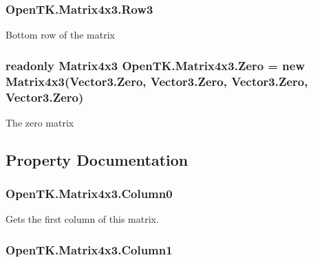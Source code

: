 \hypertarget{struct_open_t_k_1_1_matrix4x3_a8650610271ac5bd0afee0b96d1ffe5b9}{
\subsubsection[{Row3}]{ Open\-T\-K.\-Matrix4x3.\-Row3}}\label{struct_open_t_k_1_1_matrix4x3_a8650610271ac5bd0afee0b96d1ffe5b9}


Bottom row of the matrix 

\hypertarget{struct_open_t_k_1_1_matrix4x3_aafb18f8d0a699fc8d0b85a18f415b8ef}{
\subsubsection[{Zero}]{\setlength{\rightskip}{0pt plus 5cm}readonly {\bf Matrix4x3} Open\-T\-K.\-Matrix4x3.\-Zero = new {\bf Matrix4x3}(Vector3.\-Zero, Vector3.\-Zero, Vector3.\-Zero, Vector3.\-Zero)\hspace{0.3cm}{\ttfamily [static]}}}\label{struct_open_t_k_1_1_matrix4x3_aafb18f8d0a699fc8d0b85a18f415b8ef}


The zero matrix 



\subsection{Property Documentation}
\hypertarget{struct_open_t_k_1_1_matrix4x3_a386da1026761e5cc8faa795cb10867a5}{
\subsubsection[{Column0}]{ Open\-T\-K.\-Matrix4x3.\-Column0\hspace{0.3cm}{\ttfamily [get]}}}\label{struct_open_t_k_1_1_matrix4x3_a386da1026761e5cc8faa795cb10867a5}


Gets the first column of this matrix. 

\hypertarget{struct_open_t_k_1_1_matrix4x3_a3006bfcf6410491cee26015c06bfe954}{
\subsubsection[{Column1}]{ Open\-T\-K.\-Matrix4x3.\-Column1\hspace{0.3cm}{\ttfamily [get]}}}\label{struct_open_t_k_1_1_matrix4x3_a3006bfcf6410491cee26015c06bfe954}


